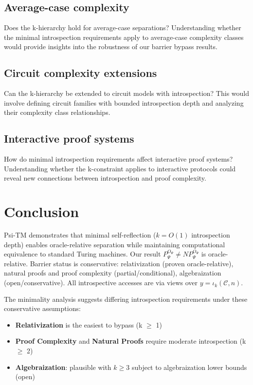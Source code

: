 \documentclass[11pt]{article}
\theoremstyle{plain}
\theoremstyle{definition}
\begin{document}
\subsection{Average-case complexity}
Does the k-hierarchy hold for average-case separations? Understanding whether the minimal introspection requirements apply to average-case complexity classes would provide insights into the robustness of our barrier bypass results.

\subsection{Circuit complexity extensions}
Can the k-hierarchy be extended to circuit models with introspection? This would involve defining circuit families with bounded introspection depth and analyzing their complexity class relationships.

\subsection{Interactive proof systems}
How do minimal introspection requirements affect interactive proof systems? Understanding whether the k-constraint applies to interactive protocols could reveal new connections between introspection and proof complexity.

\section{Conclusion}

Psi-TM demonstrates that minimal self-reflection ($k = O(1)$ introspection depth) enables oracle-relative separation while maintaining computational equivalence to standard Turing machines. Our result $P^{O_\Psi}_\Psi \neq NP^{O_\Psi}_\Psi$ is oracle-relative. Barrier status is conservative: relativization (proven oracle-relative), natural proofs and proof complexity (partial/conditional), algebraization (open/conservative). All introspective accesses are via views over $y=\iota_k(\mathcal{C},n)$.

The minimality analysis suggests differing introspection requirements under these conservative assumptions:
\begin{itemize}
\item \textbf{Relativization} is the easiest to bypass (k $\geq$ 1)
\item \textbf{Proof Complexity} and \textbf{Natural Proofs} require moderate introspection (k $\geq$ 2)
\item \textbf{Algebraization}: plausible with $k \geq 3$ subject to algebraization lower bounds (open)
\end{itemize}
\end{document}
